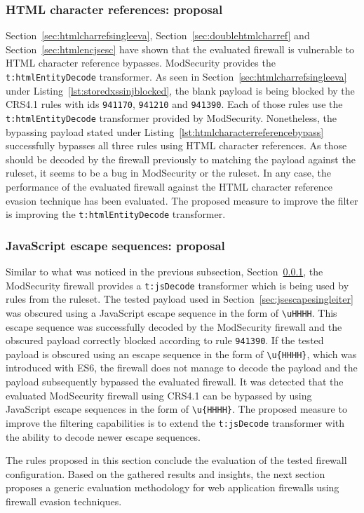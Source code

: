 \subsubsection{HTML character references: proposal}
\label{sec:htmlcharrefprop}
Section~\ref{sec:htmlcharrefsingleeva}, Section~\ref{sec:doublehtmlcharref} and Section~\ref{sec:htmlencjsesc} have shown that the evaluated firewall is vulnerable to HTML character reference bypasses. ModSecurity provides the \verb|t:htmlEntityDecode| transformer. As seen in Section~\ref{sec:htmlcharrefsingleeva} under Listing~\ref{lst:storedxssinjblocked}, the blank payload is being blocked by the CRS4.1 rules with ids \verb|941170|, \verb|941210| and \verb|941390|. Each of those rules use the \verb|t:htmlEntityDecode| transformer provided by ModSecurity. Nonetheless, the bypassing payload stated under Listing~\ref{lst:htmlcharacterreferencebypass} successfully bypasses all three rules using HTML character references. As those should be decoded by the firewall previously to matching the payload against the ruleset, it seems to be a bug in ModSecurity or the ruleset. In any case, the performance of the evaluated firewall against the HTML character reference evasion technique has been  evaluated. The proposed measure to improve the filter is improving the \verb|t:htmlEntityDecode| transformer.

\subsubsection{JavaScript escape sequences: proposal}
\label{sec:jsescprop}
Similar to what was noticed in the previous subsection, Section~\ref{sec:htmlcharrefprop}, the ModSecurity firewall provides a \verb|t:jsDecode| transformer which is being used by rules from the ruleset. The tested payload used in Section~\ref{sec:jsescapesingleiter} was obscured using a JavaScript escape sequence in the form of \verb|\uHHHH|. This escape sequence was successfully decoded by the ModSecurity firewall and the obscured payload correctly blocked according to rule \verb|941390|. If the tested payload is obscured using an escape sequence in the form of \verb|\u{HHHH}|, which was introduced with ES6, the firewall does not manage to decode the payload and the payload subsequently bypassed the evaluated firewall. It was detected that the evaluated ModSecurity firewall using CRS4.1 can be bypassed by using JavaScript escape sequences in the form of \verb|\u{HHHH}|. The proposed measure to improve the filtering capabilities is to extend the \verb|t:jsDecode| transformer with the ability to decode newer escape sequences.

\bigskip
The rules proposed in this section conclude the evaluation of the tested firewall configuration. Based on the gathered results and insights, the next section proposes a generic evaluation methodology for web application firewalls using firewall evasion techniques.
